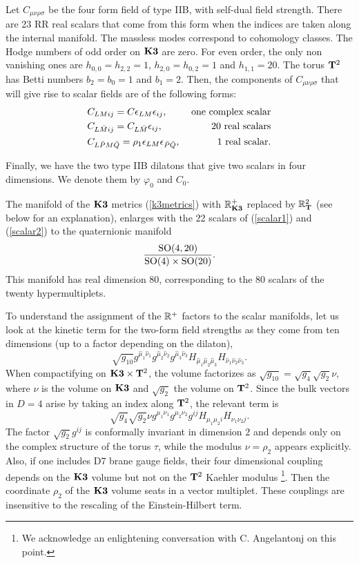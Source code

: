 \documentclass[a4paper,12pt]{article}
\begin{document}
Let $C_{\mu\nu\rho\sigma}$ be the four form field of type IIB,
with self-dual field strength. There are 23 RR real scalars that
come from this form when the indices are taken along the internal
manifold. The massless modes correspond to cohomology classes. The
Hodge numbers of odd order on $\mathbf{K3}$ are zero. For  even order, the
only non vanishing ones are  $h_{0,0}=h_{2,2}=1$,
 $h_{2,0}=h_{0,2}=1$ and $h_{1,1}=20$. The
torus $\mathbf{T}^2$ has Betti numbers $b_2=b_0=1$ and $b_1=2$.  Then, the
components of $C_{\mu\nu\rho\sigma}$ that will give rise to scalar
fields are of the following forms:
\begin{eqnarray}&
C_{LMij}=C\epsilon_{LM}\epsilon_{ij},\;  &\hbox{one complex scalar}\label{scalar1}\\
& C_{L\bar M ij}=C_{L\bar
M}\epsilon_{ij},\;   &\hbox{20 real scalars}\label{scalar2}\\
& C_{L\bar P M\bar Q}= \rho_1\epsilon_{L M}\epsilon_{\bar P\bar
Q},\;   &\hbox{1 real scalar.}\label{scalar3}\end{eqnarray}

Finally, we have the two type IIB dilatons that  give two scalars
in four dimensions. We denote them by $\varphi_0$ and $C_0$.

\bigskip

The manifold of the $\mathbf{K3}$ metrics (\ref{k3metrics}) with $\mathbb{R}_{\mathbf{K3}}^+$
replaced by  $\mathbb{R}_{\mathbf{T}}^2$ (see below for an explanation), enlarges
with the 22 scalars of (\ref{scalar1}) and (\ref{scalar2}) to the
quaternionic manifold \cite{se}
$$\frac{\mathrm{SO}(4,20)}{\mathrm{SO}(4)\times \mathrm{SO}(20)}.$$
This manifold has real dimension 80, corresponding to the 80
scalars of the twenty hypermultiplets.

To understand the assignment of the $\mathbb{R}^+$ factors to the scalar
manifolds, let us look at the kinetic term for the two-form field
strengths as they come from ten dimensions (up to a factor
depending on the dilaton),
$$\sqrt{g_{10}}g^{\hat\mu_1\hat\nu_1}g^{\hat\mu_2\hat\nu_2}g^{\hat\mu_3\hat\nu_3}H_{\hat\mu_1\hat\mu_2\hat\mu_3}
H_{\hat\nu_1\hat\nu_2\hat\nu_3}.$$ When compactifying on $\mathbf{K3}\times
\mathbf{T}^2$, the volume factorizes as
$\sqrt{g_{10}}=\sqrt{g_{4}}\sqrt{g_{2}}\nu$, where $\nu$ is the
volume on $\mathbf{K3}$ and $\sqrt{g_2}$ the volume on $\mathbf{T}^2$. Since the
bulk vectors in $D=4$ arise by taking an index along $\mathbf{T}^2$, the
relevant term is
$$\sqrt{g_{4}}\sqrt{g_{2}}\nu g^{\mu_1\nu_1}g^{\mu_2\nu_2}g^{ij}H_{\mu_1\mu_2i}
H_{\nu_1\nu_2j}.$$ The factor $\sqrt{g_{2}}g^{ij}$ is conformally
invariant in dimension 2 and depends only on the complex structure
of the torus $\tau$, while the modulus $\nu=\rho_2$ appears
explicitly.  Also, if one includes D7 brane gauge fields, their
four dimensional coupling depends on the $\mathbf{K3}$ volume but not on
the $\mathbf{T}^2$ Kaehler modulus \footnote{We acknowledge an
enlightening conversation with C. Angelantonj on this point.}.
Then the coordinate $\rho_2$ of the $\mathbf{K3}$ volume seats in a vector
multiplet.  These couplings are insensitive to the rescaling of
the Einstein-Hilbert term.
\end{document}
